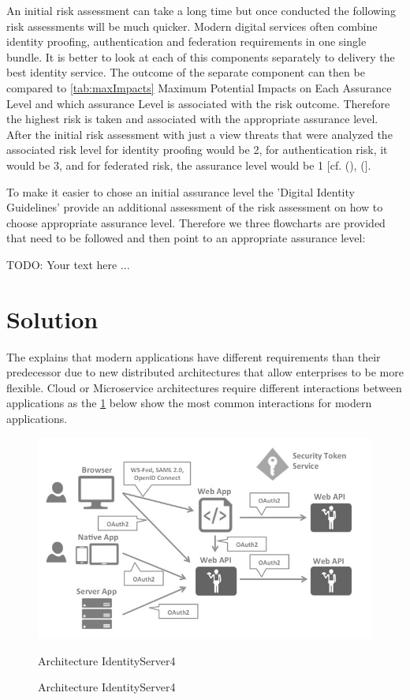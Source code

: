 An initial risk assessment can take a long time but once conducted the following risk assessments will be much quicker. Modern digital services often combine identity proofing, authentication and federation requirements in one single bundle. It is better to look at each of this components separately to delivery the best identity service. The outcome of the separate component can then be compared to \ref{tab:maxImpacts} Maximum Potential Impacts on Each Assurance Level and which assurance Level is associated with the risk outcome. Therefore the highest risk is taken and associated with the appropriate assurance level. After the initial risk assessment with just a view threats that were analyzed the associated risk level for identity proofing would be 2, for authentication risk, it would be 3, and for federated risk, the assurance level would be 1 [cf. (\cite{NIST:2017:DIG}), (\cite{NIST:2018:RMF}].

To make it easier to chose an initial assurance level the 'Digital Identity Guidelines' provide an additional assessment of the risk assessment on how to choose appropriate assurance level. Therefore we three flowcharts are provided that need to be followed and then point to an appropriate assurance level:






TODO: Your text here ...


\section{Solution}
The \cite{Sakimura:2014:OpenIDConnect} explains that modern applications have different requirements than their predecessor due to new distributed architectures that allow enterprises to be more flexible. Cloud or Microservice architectures require different interactions between applications as the \ref{fig:architecture-identityserver} below show the most common interactions for modern applications.

\begin{figure}[h]
	\centering
	\includegraphics[width=0.9\linewidth]{images/architecture-identityserver}
	\caption[Architecture IdentityServer4]{Architecture IdentityServer4}
	\caption{Architecture IdentityServer4}
	\label{fig:architecture-identityserver}
\end{figure}





